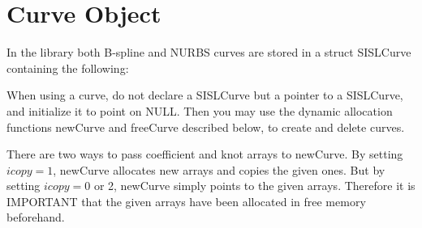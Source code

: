 \section{\label{curveobject}Curve Object}

In the library both B-spline and NURBS curves are stored in a struct SISLCurve containing
the following:

When using a curve, do not declare a SISLCurve but a pointer to a SISLCurve,
and initialize it to point on NULL. Then you may use the
dynamic allocation functions newCurve and freeCurve described below,
to create and delete curves.

There are two ways to pass coefficient and knot arrays
to newCurve.
By setting $icopy=1$, newCurve
allocates new arrays and copies the given ones.
But by setting $icopy=0$ or 2, newCurve simply points
to the given arrays. Therefore it is IMPORTANT that the
given arrays have been allocated in free memory beforehand.

\pgsbreak

\pgsbreak

\pgsbreak

